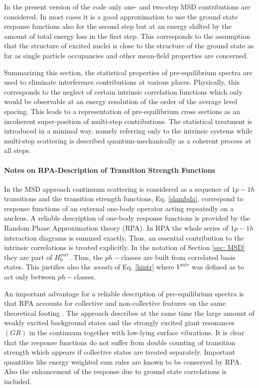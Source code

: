 \documentclass[twocolumn,amsmath,amssymb,10pt,groupedaddress,a4paper]{revtex4}
\begin{document}
In the present version of the code only one- and two-step MSD
contributions are considered. In most cases it is a good approximation
to use the ground state response functions also for the second step
but at an energy shifted by the amount of total energy loss in the
first step. This corresponds to the assumption that the structure
of excited nuclei is close to the structure of the ground state as
far as single particle occupancies and other mean-field properties
are concerned.

Summarizing this section, the statistical properties of pre-equilibrium
spectra are used to eliminate interference contributions at various
places. Physically, this corresponds to the neglect of certain intrinsic
correlation functions which only would be observable at an energy
resolution of the order of the average level spacing. This leads to
a representation of pre-equilibrium cross sections as an incoherent
super-position of multi-step contributions. The statistical treatment
is introduced in a minimal way, namely referring only to the intrinsic
systems while multi-step scattering is described quantum-mechanically
as a coherent process at all steps.


\paragraph{Notes on RPA-Description of Transition Strength Functions}
In the MSD approach continuum scattering is considered
as a sequence of $1p-1h$ transitions and the transition strength
functions, Eq. \ref{slambda}, correspond to response functions of
an external one-body operator acting repeatedly on a nucleus. A reliable
description of one-body response functions is provided by the Random
Phase Approximation theory \cite{Neg,Wal} (RPA). In RPA
the whole series of $1p-1h$ interaction diagrams is summed exactly.
Thus, an essential contribution to the intrinsic correlations is treated
explicitly. In the notation of Section \ref{sec: MSD} they are part
of $H_{0}^{intr}$. Thus, the $ph-$classes are built from correlated
basis states. This justifies also the \textit{ansatz} of Eq. \ref{hintr}
where $V^{intr}$ was defined as to act only between $ph-$classes.

An important advantage for a reliable description of pre-equilibrium
spectra is that RPA accounts for collective and non-collective
features on the same theoretical footing \cite{Wal,BM,LW92,SLW,RegT}.
The approach describes at the same time the large amount of weakly
excited background states and the strongly excited giant resonances
$(GR)$ in the continuum together with low-lying surface vibrations.
It is clear that the response functions do not suffer from double
counting of transition strength which appears if collective states
are treated separately. Important quantities like energy weighted
sum rules are known to be conserved by RPA. Also the enhancement
of the response due to ground state correlations is included.
\end{document}
